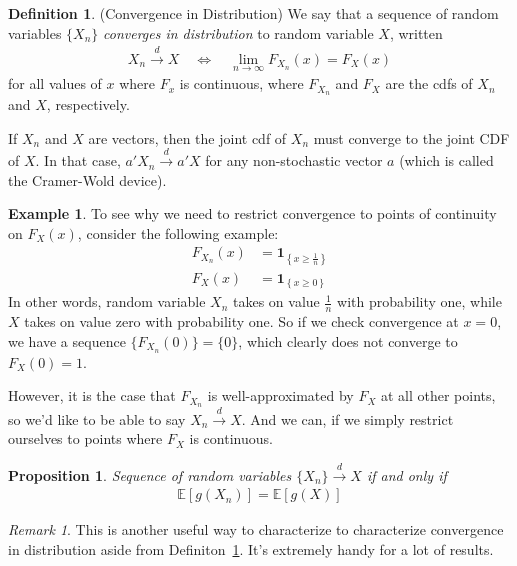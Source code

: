 \documentclass[12pt]{article}
\theoremstyle{plain}
\newtheorem{prop}[thm]{Proposition}
\theoremstyle{definition}
\newtheorem{defn}[thm]{Definition}
\newtheorem{ex}[thm]{Example}
\theoremstyle{remark}
\newtheorem*{rmk}{Remark}
\newcommand{\limn}{\lim_{n\rightarrow\infty}}
\newcommand{\one}{\boldsymbol{1}}
\newcommand{\E}{\mathbb{E}}
\newcommand{\dto}{\xrightarrow{d}}
\begin{document}
\begin{defn}{(Convergence in Distribution)}
\label{defn:convergeInDistribution}
We say that a sequence of random variables $\{X_n\}$
\emph{converges in distribution} to random variable $X$, written
\begin{align*}
  X_n\dto X
  \quad\iff\quad
  \limn F_{X_n}(x) = F_X(x)
\end{align*}
for all values of $x$ where $F_x$ is continuous,
where $F_{X_n}$ and $F_X$ are the cdfs of $X_n$ and $X$, respectively.

If $X_n$ and $X$ are vectors, then the joint cdf of $X_n$ must converge
to the joint CDF of $X$. In that case, $a'X_n \dto a'X$ for any
non-stochastic vector $a$ (which is called the Cramer-Wold device).
\end{defn}
\begin{ex}
To see why we need to restrict convergence to points of continuity on
$F_X(x)$, consider the following example:
\begin{align*}
  F_{X_n}(x) &= \one_{\left\{x\geq \frac{1}{n}\right\}}\\
  F_{X}(x) &= \one_{\left\{x\geq 0\right\}}
\end{align*} In other words, random variable $X_n$ takes on value
$\frac{1}{n}$ with probability one, while $X$ takes on value zero with
probability one.  So if we check convergence at $x=0$, we have a
sequence $\{F_{X_n}(0)\}=\{0\}$, which clearly does not converge to
$F_X(0)=1$.

However, it is the case that $F_{X_n}$ is well-approximated by $F_X$ at
all other points, so we'd like to be able to say $X_n\dto X$. And we
can, if we simply restrict ourselves to points where $F_X$ is
continuous.
\end{ex}

\begin{prop}
Sequence of random variables $\{X_n\} \dto X$ if and only if
\begin{align*}
  \E[g(X_n)] = \E[g(X)]
\end{align*}
\end{prop}
\begin{rmk}
This is another useful way to characterize to characterize convergence
in distribution aside from Definiton~\ref{defn:convergeInDistribution}.
It's extremely handy for a lot of results.
\end{rmk}
\end{document}
